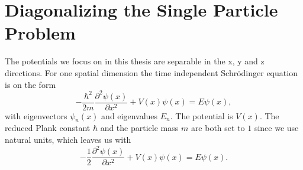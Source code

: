 \documentclass[../main.tex]{subfiles}
\begin{document}
\section{Diagonalizing the Single Particle Problem}\label{sec:Diag_SP_Problem}

The potentials we focus on in this thesis are separable in the x, y and z directions. For one spatial dimension the time independent Schr\"odinger equation is on the form\cite{Schrodinger}
\begin{equation}
    -\frac{\hbar^2}{2m}\frac{\partial^2\psi(x)}{\partial x^2} + V(x)\psi(x) = E\psi(x),
\end{equation}
with eigenvectors $\psi_n(x)$ and eigenvalues $E_n$. The potential is $V(x)$. The reduced Plank constant $\hbar$ and the particle mass $m$ are both set to $1$ since we use natural units, which leaves us with
\begin{equation}\label{eq: SEq Natural}
    -\frac{1}{2}\frac{\partial^2\psi(x)}{\partial x^2} + V(x)\psi(x) = E\psi(x).
\end{equation}
\end{document}
